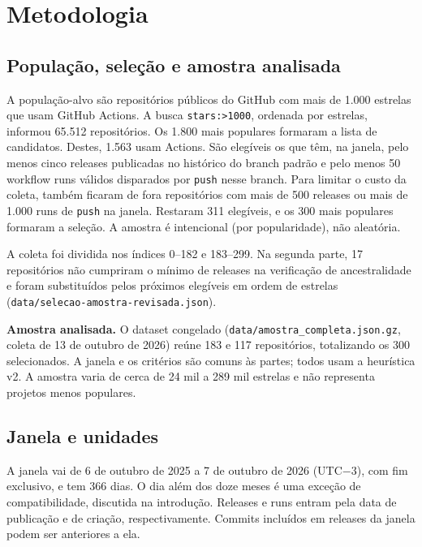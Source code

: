 \section{Metodologia}
\label{sec:metodologia}

\subsection{População, seleção e amostra analisada}
\label{sec:amostra}

A população-alvo são repositórios públicos do GitHub com mais de 1.000
estrelas que usam GitHub Actions. A busca \texttt{stars:>1000}, ordenada por
estrelas, informou 65.512 repositórios. Os 1.800 mais populares formaram a
lista de candidatos. Destes, 1.563 usam Actions. São elegíveis os que têm, na
janela, pelo menos cinco releases publicadas no histórico do branch padrão e
pelo menos 50 workflow runs válidos disparados por \texttt{push} nesse branch.
Para limitar o custo da coleta, também ficaram de fora repositórios com mais de
500 releases ou mais de 1.000 runs de \texttt{push} na janela. Restaram 311
elegíveis, e os 300 mais populares formaram a seleção. A amostra é intencional
(por popularidade), não aleatória.

A coleta foi dividida nos índices 0--182 e 183--299. Na segunda parte, 17
repositórios não cumpriram o mínimo de releases na verificação de ancestralidade
e foram substituídos pelos próximos elegíveis em ordem de estrelas
(\texttt{data/selecao-amostra-revisada.json}).

\textbf{Amostra analisada.} O dataset congelado
(\texttt{data/amostra\_completa.json.gz}, coleta de 13 de outubro de 2026)
reúne 183 e 117 repositórios, totalizando os 300 selecionados. A janela e os
critérios são comuns às partes; todos usam a heurística v2. A amostra varia de
cerca de 24 mil a 289 mil estrelas e não representa projetos menos populares.

\subsection{Janela e unidades}

A janela vai de 6 de outubro de 2025 a 7 de outubro de 2026 (UTC$-3$), com fim
exclusivo, e tem 366 dias. O dia além dos doze meses é uma exceção de
compatibilidade, discutida na introdução. Releases e runs entram pela data de
publicação e de criação, respectivamente. Commits incluídos em releases da
janela podem ser anteriores a ela.

